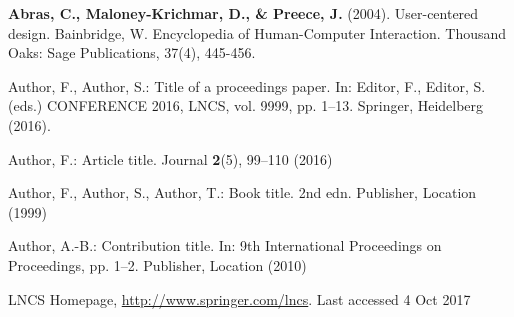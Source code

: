 \documentclass[runningheads]{llncs}
\begin{document}
\begin{thebibliography}{8}
 \textbf{Abras, C., Maloney-Krichmar, D., \& Preece, J.} (2004). User-centered design. Bainbridge, W. Encyclopedia of Human-Computer Interaction. Thousand Oaks: Sage Publications, 37(4), 445-456.

Author, F., Author, S.: Title of a proceedings paper. In: Editor,
F., Editor, S. (eds.) CONFERENCE 2016, LNCS, vol. 9999, pp. 1--13.
Springer, Heidelberg (2016). 

Author, F.: Article title. Journal \textbf{2}(5), 99--110 (2016)

Author, F., Author, S., Author, T.: Book title. 2nd edn. Publisher,
Location (1999)

Author, A.-B.: Contribution title. In: 9th International Proceedings
on Proceedings, pp. 1--2. Publisher, Location (2010)

LNCS Homepage, \url{http://www.springer.com/lncs}. Last accessed 4
Oct 2017
\end{thebibliography}
\end{document}
